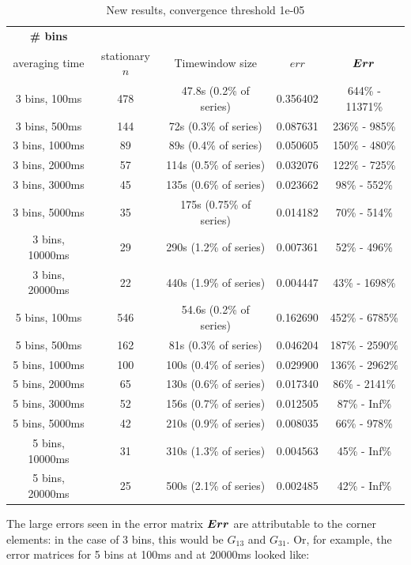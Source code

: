 \begin{table}[H]
\small
\centering
\caption{New results, convergence threshold 1e-05}
\vspace*{2.5mm}
\begin{tabular}{c|c|c|c|c}
\hline
\bf \# bins & & & & \\ averaging time & stationary $n$ & Timewindow size & $err$ & $\boldsymbol{Err}$ \\
\hline\hline
3 bins, 100ms & 478 & 47.8s (0.2\% of series) & 0.356402 & 644\% - 11371\% \\
\hline
3 bins, 500ms & 144 & 72s (0.3\% of series) & 0.087631 & 236\% - 985\% \\
\hline
3 bins, 1000ms & 89 & 89s (0.4\% of series) &  0.050605 & 150\% - 480\% \\
\hline
3 bins, 2000ms & 57 & 114s (0.5\% of series) & 0.032076 & 122\% - 725\% \\
\hline
3 bins, 3000ms & 45 & 135s (0.6\% of series) & 0.023662 & 98\% - 552\% \\
\hline
3 bins, 5000ms & 35 & 175s (0.75\% of series) & 0.014182 & 70\% - 514\% \\
\hline
3 bins, 10000ms & 29 & 290s (1.2\% of series) & 0.007361 & 52\% - 496\% \\
\hline
3 bins, 20000ms & 22 & 440s (1.9\% of series) & 0.004447 & 43\% - 1698\% \\
\hline
\hline
5 bins, 100ms & 546 & 54.6s (0.2\% of series) & 0.162690 & 452\% - 6785\% \\
\hline
5 bins, 500ms & 162 & 81s (0.3\% of series) &  0.046204 & 187\% - 2590\% \\
\hline
5 bins, 1000ms & 100 & 100s (0.4\% of series) & 0.029900 & 136\% - 2962\% \\
\hline
5 bins, 2000ms & 65 & 130s (0.6\% of series)  & 0.017340 & 86\% - 2141\% \\
\hline
5 bins, 3000ms & 52 & 156s (0.7\% of series) &  0.012505 & 87\% - Inf\% \\
\hline
5 bins, 5000ms & 42 & 210s (0.9\% of series) & 0.008035 & 66\% - 978\% \\
\hline
5 bins, 10000ms & 31 & 310s (1.3\% of series) & 0.004563 & 45\% - Inf\% \\
\hline
5 bins, 20000ms & 25 & 500s (2.1\% of series) & 0.002485 & 42\% - Inf\% \\
\hline
\end{tabular}
\end{table}

The large errors seen in the error matrix $\boldsymbol{Err}$ are attributable to the corner elements: in the case of 3 bins, this would be $G_{13}$ and $G_{31}$. Or, for example, the error matrices for 5 bins at 100ms and at 20000ms looked like:

